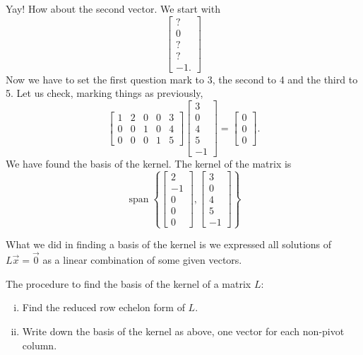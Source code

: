\begin{example}
Yay!  How about the second vector.  We start with
\begin{equation*}
\begin{bmatrix}
? \\ 0 \\ ? \\ ? \\ -1 .
\end{bmatrix}
\end{equation*}
Now we have to set the first question mark to 3, the second to 4 and the
third to 5.  Let us check, marking things as previously,
\begin{equation*}
\begin{bmatrix}
1 & 2 & 0 & 0 & \boxed{3} \\
0 & 0 & 1 & 0 & \boxed{4} \\
0 & 0 & 0 & 1 & \boxed{5}
\end{bmatrix} 
\begin{bmatrix}
\boxed{3} \\ 0 \\ \boxed{4} \\ \boxed{5} \\ -1
\end{bmatrix}
=
\begin{bmatrix}
0 \\ 0 \\ 0
\end{bmatrix}
.
\end{equation*}
We have found the basis of the kernel.  The kernel of the matrix is
\begin{equation*}
\operatorname{span} \left\{
\begin{bmatrix}
2 \\ -1 \\ 0 \\ 0 \\ 0
\end{bmatrix}
,
\begin{bmatrix}
3 \\ 0 \\ 4 \\ 5 \\ -1
\end{bmatrix}
\right\}
\end{equation*}
\end{example}

What we did in finding a basis of the kernel is we expressed all
solutions of
$L \vec{x} = \vec{0}$ as a linear combination of some given vectors.

\pagebreak[2]
The procedure to find the basis of the kernel of a matrix $L$:
\begin{enumerate}[(i)]
\item Find the reduced row echelon form of $L$.
\item Write down the basis of the kernel as above, one vector for each
non-pivot column.
\end{enumerate}


